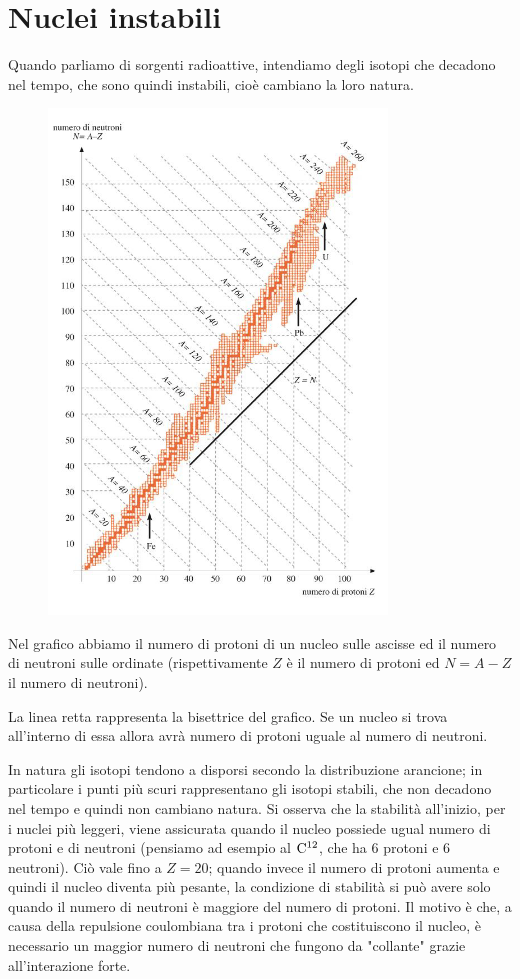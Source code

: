 \section{Nuclei instabili}

Quando parliamo di sorgenti radioattive, intendiamo degli isotopi che decadono nel tempo, che sono quindi instabili, cioè cambiano la loro natura.

\begin{figure}[H]
    \centering
    \includegraphics[width=9cm]{immagini/carta_di_segre.png}
\end{figure}

Nel grafico abbiamo il numero di protoni di un nucleo sulle ascisse ed il numero di neutroni sulle ordinate (rispettivamente $Z$ è il numero di protoni ed $N=A-Z$ il numero di neutroni).

La linea retta rappresenta la bisettrice del grafico. Se un nucleo si trova all'interno di essa allora avrà numero di protoni uguale al numero di neutroni.

In natura gli isotopi tendono a disporsi secondo la distribuzione arancione; in particolare i punti più scuri rappresentano gli isotopi stabili, che non decadono nel tempo e quindi non cambiano natura. Si osserva che la stabilità all'inizio, per i nuclei più leggeri, viene assicurata quando il nucleo possiede ugual numero di protoni e di neutroni (pensiamo ad esempio al $\rm C^{12}$, che ha 6 protoni e 6 neutroni). Ciò vale fino a $Z=20$; quando invece il numero di protoni aumenta e quindi il nucleo diventa più pesante, la condizione di stabilità si può avere solo quando il numero di neutroni è maggiore del numero di protoni. Il motivo è che, a causa della repulsione coulombiana tra i protoni che costituiscono il nucleo, è necessario un maggior numero di neutroni che fungono da "collante" grazie all'interazione forte.

